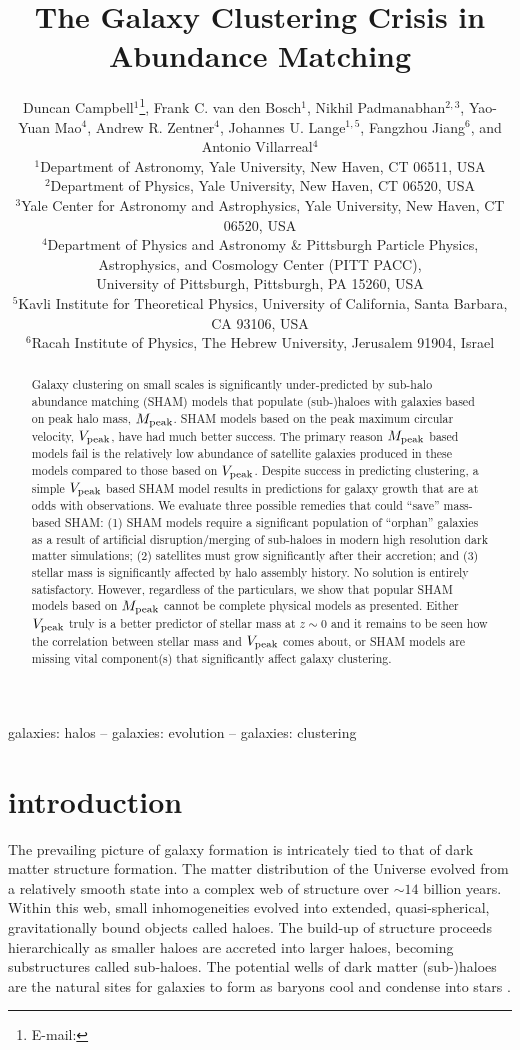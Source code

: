 \documentclass[useAMS,fleqn,usenatbib]{mnras}
\title[The Galaxy Clustering Crisis]{The Galaxy Clustering Crisis in Abundance Matching}
\author[Campbell et al.]{%
Duncan Campbell$^{1}$\thanks{E-mail:  \mailto{duncan.campbell@yale.edu}},
Frank C. van den Bosch$^{1}$,
Nikhil Padmanabhan$^{2, 3}$,\newauthor 
Yao-Yuan Mao$^{4}$, 
Andrew R. Zentner$^{4}$,
Johannes U. Lange$^{1, 5}$,
Fangzhou Jiang$^{6}$,\newauthor 
and Antonio Villarreal$^{4}$\vspace*{0.2em} \\ 
$^{1}$Department of Astronomy, Yale University, New Haven, CT 06511, USA\\
$^{2}$Department of Physics, Yale University, New Haven, CT 06520, USA \\
$^{3}$Yale Center for Astronomy and Astrophysics, Yale University, New Haven, CT 06520, USA\\
$^{4}$Department of Physics and Astronomy \& Pittsburgh Particle Physics, Astrophysics, and Cosmology Center (PITT PACC),\\ University of Pittsburgh, Pittsburgh, PA 15260, USA\\
$^{5}$Kavli Institute for Theoretical Physics, University of California, Santa Barbara, CA 93106, USA\\
$^{6}$Racah Institute of Physics, The Hebrew University, Jerusalem 91904, Israel
}
\begin{document}
\label{firstpage}
\pagerange{\pageref{firstpage}--\pageref{lastpage}}
\maketitle

\begin{abstract}
Galaxy clustering on small scales is significantly under-predicted by sub-halo abundance matching (SHAM) models that populate (sub-)haloes with galaxies based on peak halo mass, $M_{\rm peak}$.  SHAM models based on the peak maximum circular velocity, $V_{\rm peak}$, have had much better success.  The primary reason $M_{\rm peak}$ based models fail is the relatively low abundance of satellite galaxies produced in these models compared to those based on $V_{\rm peak}$.  Despite success in predicting clustering, a simple $V_{\rm peak}$ based SHAM model results in predictions for galaxy growth that are at odds with observations.  We evaluate three possible remedies that could ``save'' mass-based SHAM: (1) SHAM models require a significant population of ``orphan'' galaxies as a result of artificial disruption/merging of sub-haloes in modern high resolution dark matter simulations; (2) satellites must grow significantly after their accretion; and (3) stellar mass is significantly affected by halo assembly history. No solution is entirely satisfactory. However, regardless of the particulars, we show that popular SHAM models based on $M_{\rm peak}$ cannot be complete physical models as presented.  Either $V_{\rm peak}$ truly is a better predictor of stellar mass at $z\sim 0$ and it remains to be seen how the correlation between stellar mass and $V_{\rm peak}$ comes about, or SHAM models are missing vital component(s) that significantly affect galaxy clustering.
\end{abstract}

\begin{keywords}
galaxies: halos -- galaxies: evolution -- galaxies: clustering
\end{keywords}

\section{introduction}

The prevailing picture of galaxy formation is intricately tied to that of dark matter structure formation.  The matter distribution of the Universe evolved from a relatively smooth state into a complex web of structure over $\sim 14$ billion years. Within this web, small inhomogeneities evolved into extended, quasi-spherical, gravitationally bound objects called haloes. The build-up of structure proceeds hierarchically as smaller haloes are accreted into larger haloes, becoming substructures called sub-haloes. The potential wells of dark matter (sub-)haloes are the natural sites for galaxies to form as baryons cool and condense into stars \citep{Rees:1977gr, White:1978uk, Fall:1980br}. 
\end{document}
